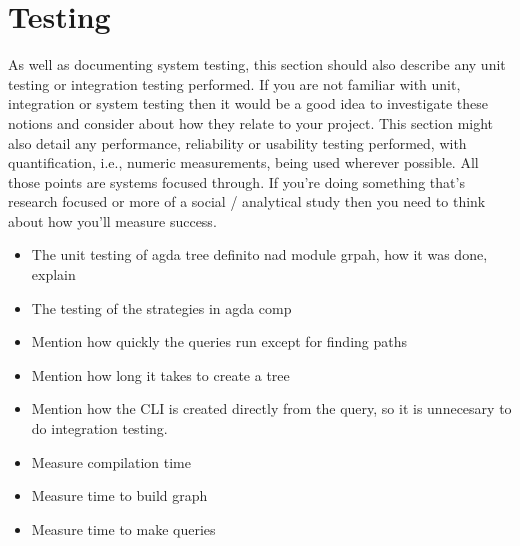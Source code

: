
\chapter{Testing}

As well as documenting system testing, this section should also describe any
unit testing or integration testing performed. If you are not familiar with
unit, integration or system testing then it would be a good idea to investigate
these notions and consider about how they relate to your project. This section
might also detail any performance, reliability or usability testing performed,
with quantification, i.e., numeric measurements, being used wherever possible.
All those points are systems focused through. If you’re doing something that’s
research focused or more of a social / analytical study then you need to think
about how you’ll measure success.

\begin{itemize}
\item The unit testing of agda tree definito nad module grpah, how it was done,
  explain 
\item The testing of the strategies in agda comp 
\item Mention how quickly the queries run except for finding paths 
\item Mention how long it takes to create a tree 
\item Mention how the CLI is created directly from the query, so it is
  unnecesary to do integration testing.
\item Measure compilation time 
\item Measure time to build graph 
\item Measure time to make queries 
\end{itemize}

